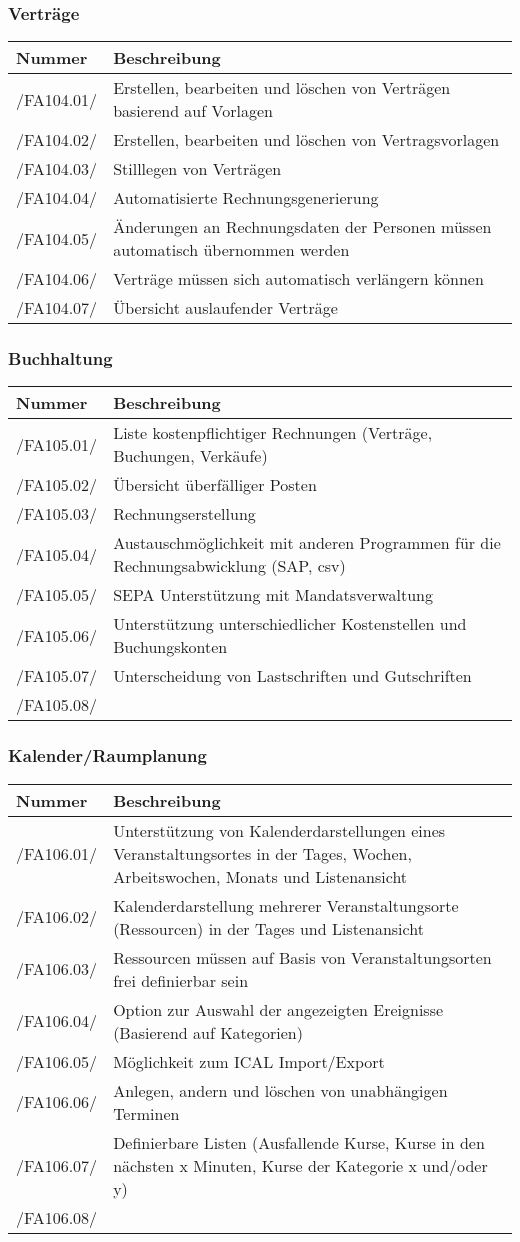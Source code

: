 \documentclass[a4paper,11pt]{article}
\newcommand\addrow[2]{#1 &#2\\ }
\newcommand\addheading[2]{#1 &#2\\ \hline}
\newcommand\tabularhead{\begin{tabular}{lp{13cm}}
\hline
}
\newenvironment{usecase}{\tabularhead}
{\hline\end{tabular}}
\begin{document}
\subsubsection{Verträge}
\begin{usecase}
  \addheading{Nummer}{Beschreibung} 
  \addrow{/FA104.01/}{Erstellen, bearbeiten und löschen von Verträgen basierend auf Vorlagen} 
  \addrow{/FA104.02/}{Erstellen, bearbeiten und löschen von Vertragsvorlagen}
  \addrow{/FA104.03/}{Stilllegen von Verträgen}
  \addrow{/FA104.04/}{Automatisierte Rechnungsgenerierung}
  \addrow{/FA104.05/}{Änderungen an Rechnungsdaten der Personen müssen automatisch übernommen werden}
  \addrow{/FA104.06/}{Verträge müssen sich automatisch verlängern können}
  \addrow{/FA104.07/}{Übersicht auslaufender Verträge}
\end{usecase}

\subsubsection{Buchhaltung}
\begin{usecase}
  \addheading{Nummer}{Beschreibung} 
  \addrow{/FA105.01/}{Liste kostenpflichtiger Rechnungen (Verträge, Buchungen, Verkäufe)} 
  \addrow{/FA105.02/}{Übersicht überfälliger Posten}
  \addrow{/FA105.03/}{Rechnungserstellung}
  \addrow{/FA105.04/}{Austauschmöglichkeit mit anderen Programmen für die Rechnungsabwicklung (SAP, csv)}
  \addrow{/FA105.05/}{SEPA Unterstützung mit Mandatsverwaltung}
  \addrow{/FA105.06/}{Unterstützung unterschiedlicher Kostenstellen und Buchungskonten}
  \addrow{/FA105.07/}{Unterscheidung von Lastschriften und Gutschriften}
  \addrow{/FA105.08/}{}
\end{usecase}

\subsubsection{Kalender/Raumplanung}
\begin{usecase}
  \addheading{Nummer}{Beschreibung} 
  \addrow{/FA106.01/}{Unterstützung von Kalenderdarstellungen eines Veranstaltungsortes in der Tages, Wochen, Arbeitswochen, Monats und Listenansicht}
  \addrow{/FA106.02/}{Kalenderdarstellung mehrerer Veranstaltungsorte (Ressourcen) in der Tages und Listenansicht}
  \addrow{/FA106.03/}{Ressourcen müssen auf Basis von Veranstaltungsorten frei definierbar sein}
  \addrow{/FA106.04/}{Option zur Auswahl der angezeigten Ereignisse (Basierend auf Kategorien)}
  \addrow{/FA106.05/}{Möglichkeit zum ICAL Import/Export}
  \addrow{/FA106.06/}{Anlegen, andern und löschen von unabhängigen Terminen}
  \addrow{/FA106.07/}{Definierbare Listen (Ausfallende Kurse, Kurse in den nächsten x Minuten, Kurse der Kategorie x und/oder y)}
  \addrow{/FA106.08/}{}
\end{usecase}
\end{document}
